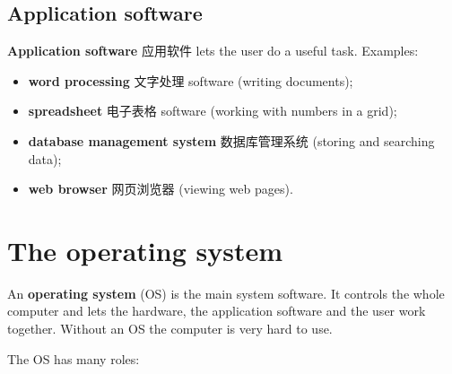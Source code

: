 \documentclass[11pt]{article}
\begin{document}
\subsection*{Application software}

\textbf{Application software} 应用软件 lets the user do a useful task. Examples:

\begin{itemize}
\item \textbf{word processing} 文字处理 software (writing documents);

\item \textbf{spreadsheet} 电子表格 software (working with numbers in a grid);

\item \textbf{database management system} 数据库管理系统 (storing and searching data);

\item \textbf{web browser} 网页浏览器 (viewing web pages).

\end{itemize}

\begin{center}
\end{center}

\section*{The operating system}

An \textbf{operating system} (OS) is the main system software. It controls the whole computer and lets the hardware, the application software and the user work together. Without an OS the computer is very hard to use.

The OS has many roles:
\end{document}
